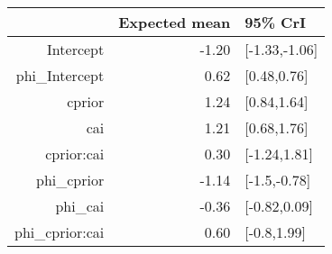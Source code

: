\begin{tabular}{rrl}
  \hline
 & Expected mean & 95\% CrI \\ 
  \hline
Intercept & -1.20 & [-1.33,-1.06] \\ 
  phi\_Intercept & 0.62 & [0.48,0.76] \\ 
  cprior & 1.24 & [0.84,1.64] \\ 
  cai & 1.21 & [0.68,1.76] \\ 
  cprior:cai & 0.30 & [-1.24,1.81] \\ 
  phi\_cprior & -1.14 & [-1.5,-0.78] \\ 
  phi\_cai & -0.36 & [-0.82,0.09] \\ 
  phi\_cprior:cai & 0.60 & [-0.8,1.99] \\ 
   \hline
\end{tabular}

